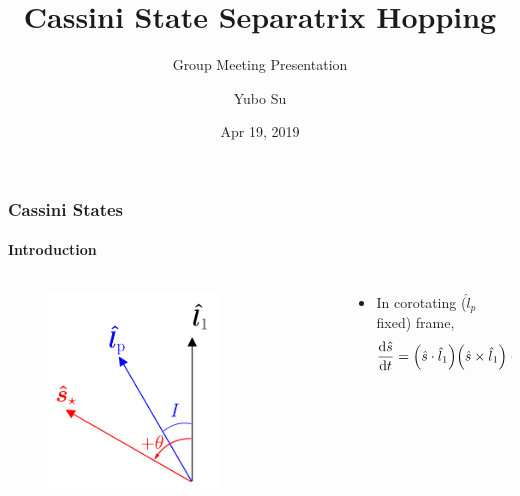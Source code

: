 \documentclass[dvipsnames]{beamer}
\newcommand*{\rd}[2]{\frac{\mathrm{d}#1}{\mathrm{d}#2}}
\DeclarePairedDelimiter\p{\lparen}{\rparen}
\begin{document}
\title{Cassini State Separatrix Hopping}
\subtitle{Group Meeting Presentation}
\author{Yubo Su}
\date{Apr 19, 2019}

\maketitle

\begin{frame}
    \frametitle{Cassini States}
    \framesubtitle{Introduction}

    \begin{columns}
        \begin{column}{0.45\textwidth}
            \begin{figure}[t]
                \centering
                \includegraphics[width=0.7\textwidth]{plots/cassini.png}
            \end{figure}
        \end{column}
        \begin{column}{0.45\textwidth}
            \begin{itemize}
                \item In corotating ($\hat{l}_p$ fixed) frame,
                    \begin{equation*}
                        \rd{\hat{s}}{t}
                            = \p*{\hat{s} \cdot \hat{l}_1}
                                \p*{\hat{s} \times \hat{l}_1} - \eta
                                    \p*{\hat{s} \times \hat{l}_p}.
                    \end{equation*}
                \begin{itemize}

\end{itemize}
\end{itemize}
\end{column}
\end{columns}
\end{frame}
\end{document}
